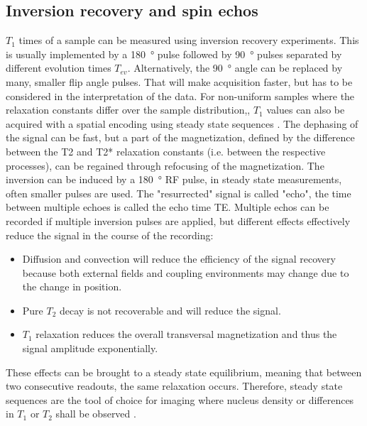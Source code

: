         \subsection{Inversion recovery and spin echos}
            $T_1$ times of a sample can be measured using inversion recovery experiments. This is usually implemented by a \SI{180}{\degree} pulse followed by \SI{90}{\degree} pulses separated by different evolution times $T_{ev}$. Alternatively, the \SI{90}{\degree} angle can be replaced by many, smaller flip angle pulses. That will make acquisition faster, but has to be considered in the interpretation of the data. For non-uniform samples where the relaxation constants differ over the sample distribution,, $T_1$ values can also be acquired with a spatial encoding using steady state sequences \cite{scheffler_t1_2001}.
            The dephasing of the signal can be fast, but a part of the magnetization, defined by the difference between the T2 and T2* relaxation constants (i.e. between the respective processes), can be regained through refocusing of the magnetization. The inversion can be induced by a \SI{180}{\degree} RF pulse, in steady state measurements, often smaller pulses are used. The "resurrected" signal is called "echo", the time between multiple echoes is called the echo time TE. Multiple echos can be recorded if multiple inversion pulses are applied, but different effects effectively reduce the signal in the course of the recording:
            \begin{itemize}
                \item Diffusion and convection will reduce the efficiency of the signal recovery because both external fields and coupling environments may change due to the change in position.
                \item Pure $T_2$ decay is not recoverable and will reduce the signal.
                \item $T_1$ relaxation reduces the overall transversal magnetization and thus the signal amplitude exponentially.
            \end{itemize}
             These effects can be brought to a steady state equilibrium, meaning that between two consecutive readouts, the same relaxation occurs. Therefore, steady state sequences are the tool of choice for imaging where nucleus density or differences in $T_1$ or $T_2$ shall be observed  \cite{nitz_contrast_1999}.
